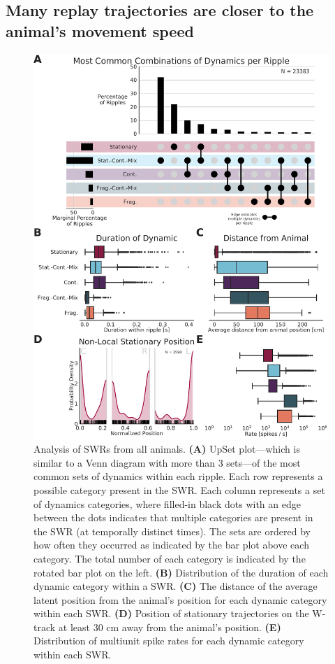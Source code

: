 \documentclass[times, twoside]{zHenriquesLab-StyleBioRxiv}
\begin{document}
\subsection*{Many replay trajectories are closer to the animal's movement speed}
\begin{figure}%
\centering
\includegraphics[width=0.80\linewidth]{figures/Figure4/Figure4_v4}
\caption{
Analysis of SWRs from all animals. \textbf{(A)} UpSet plot---which is similar to a Venn diagram with more than 3 sets---of the most common sets of dynamics within each ripple. Each row represents a possible category present in the SWR. Each column represents a set of dynamics categories, where filled-in black dots with an edge between the dots indicates that multiple categories are present in the SWR (at temporally distinct times). The sets are ordered by how often they occurred as indicated by the bar plot above each category. The total number of each category is indicated by the rotated bar plot on the left. \textbf{(B)} Distribution of the duration of each dynamic category within a SWR. \textbf{(C)} The distance of the average latent position from the animal's position for each dynamic category within each SWR. \textbf{(D)} Position of stationary trajectories on the W-track at least 30 cm away from the animal's position. \textbf{(E)} Distribution of multiunit spike rates for each dynamic category within each SWR.
}
\label{4}
\end{figure}
\end{document}
